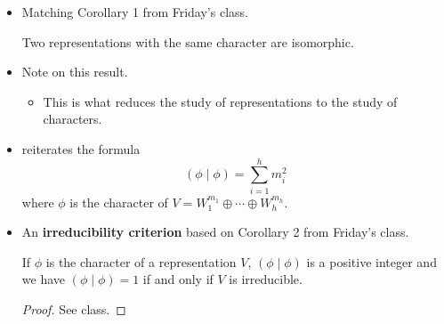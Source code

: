 \documentclass[../notes.tex]{subfiles}
\begin{document}
\begin{itemize}
\begin{corollary}
    \end{corollary}
    \item Matching Corollary 1 from Friday's class.
    \begin{corollary}
        Two representations with the same character are isomorphic.
    \end{corollary}
    \item Note on this result.
    \begin{itemize}
        \item This is what reduces the study of representations to the study of characters.
    \end{itemize}
    \item \textcite{bib:Serre} reiterates the formula
    \begin{equation*}
        (\phi\mid\phi) = \sum_{i=1}^hm_i^2
    \end{equation*}
    where $\phi$ is the character of $V=W_1^{m_1}\oplus\cdots\oplus W_h^{m_h}$.
    \item An \textbf{irreducibility criterion} based on Corollary 2 from Friday's class.
    \begin{theorem}
        If $\phi$ is the character of a representation $V$, $(\phi\mid\phi)$ is a positive integer and we have $(\phi\mid\phi)=1$ if and only if $V$ is irreducible.
        \begin{proof}
            See class.
        \end{proof}
    \end{theorem}
\end{itemize}
\end{document}
